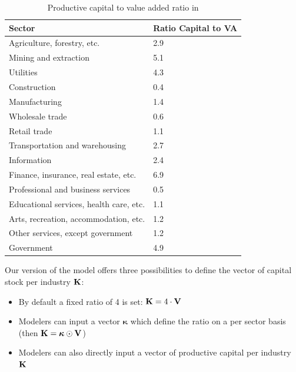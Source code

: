\documentclass[main.tex]{subfiles}
\begin{document}
\begin{table}[h]
  \centering
  \begin{tabular}{@{}ll@{}}
    \toprule
    \textbf{Sector}                         & \textbf{Ratio Capital to VA} \\ \midrule
    Agriculture, forestry, etc.             & 2.9                          \\
    Mining and extraction                   & 5.1                          \\
    Utilities                               & 4.3                          \\
    Construction                            & 0.4                          \\
    Manufacturing                           & 1.4                          \\
    Wholesale trade                         & 0.6                          \\
    Retail trade                            & 1.1                          \\
    Transportation and warehousing          & 2.7                          \\
    Information                             & 2.4                          \\
    Finance, insurance, real estate, etc.   & 6.9                          \\
    Professional and business services      & 0.5                          \\
    Educational services, health care, etc. & 1.1                          \\
    Arts, recreation, accommodation, etc.   & 1.2                          \\
    Other services, except government       & 1.2                          \\
    Government                              & 4.9 \\
    \bottomrule
  \end{tabular}%
  \caption{Productive capital to value added ratio in \textcite{hallegatte-2013-model-role}}
  \label{tab:capital-va-ratio}
\end{table}

Our version of the model offers three possibilities to define the vector of
capital stock per industry $\mathbf{K}$:
\begin{itemize}
\item By default a fixed ratio of 4 is set: $\mathbf{K} = 4 \cdot \mathbf{V}$
\item Modelers can input a vector $\bm{\kappa}$ which define the ratio on a per
  sector basis (then $\mathbf{K} = \bm{\kappa} \odot \mathbf{V}$)
\item Modelers can also directly input a vector of productive capital per industry $\mathbf{K}$
\end{itemize}
\end{document}

